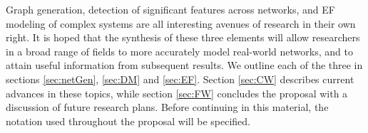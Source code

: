 \documentclass[11pt]{article}
\begin{document}
\indent Graph generation, detection of significant features across networks, and EF modeling of complex systems are all interesting avenues of research in their own right. It is hoped that the synthesis of these three elements will allow researchers in a broad range of fields to more accurately model real-world networks, and to attain useful information from subsequent results. We outline each of the three in sections \ref{sec:netGen}, \ref{sec:DM} and \ref{sec:EF}. Section \ref{sec:CW} describes current advances in these topics, while section \ref{sec:FW} concludes the proposal with a discussion of future research plans. Before continuing in this material, the notation used throughout the proposal will be specified.
\end{document}
